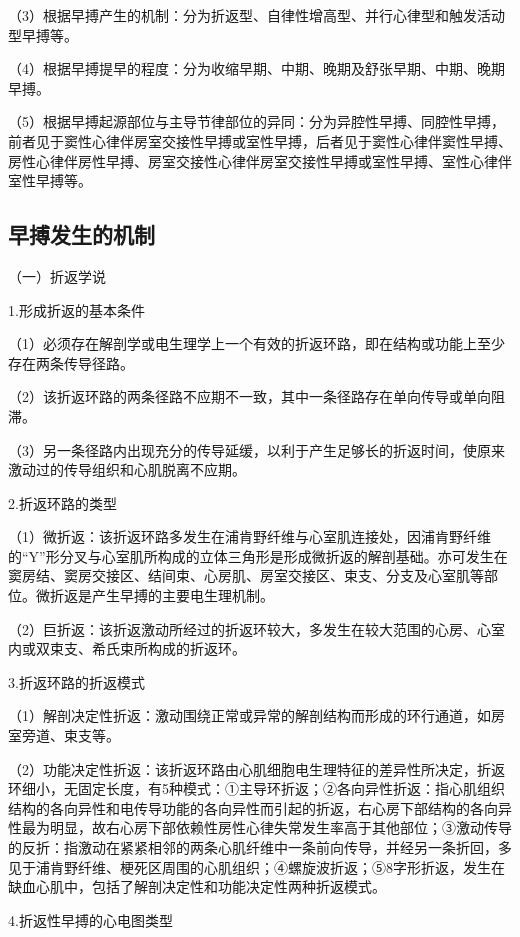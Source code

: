 （3）根据早搏产生的机制：分为折返型、自律性增高型、并行心律型和触发活动型早搏等。

（4）根据早搏提早的程度：分为收缩早期、中期、晚期及舒张早期、中期、晚期早搏。

（5）根据早搏起源部位与主导节律部位的异同：分为异腔性早搏、同腔性早搏，前者见于窦性心律伴房室交接性早搏或室性早搏，后者见于窦性心律伴窦性早搏、房性心律伴房性早搏、房室交接性心律伴房室交接性早搏或室性早搏、室性心律伴室性早搏等。

\protect\hypertarget{text00018.htmlux5cux23subid126}{}{}

\subsection{早搏发生的机制}

（一）折返学说

1.形成折返的基本条件

（1）必须存在解剖学或电生理学上一个有效的折返环路，即在结构或功能上至少存在两条传导径路。

（2）该折返环路的两条径路不应期不一致，其中一条径路存在单向传导或单向阻滞。

（3）另一条径路内出现充分的传导延缓，以利于产生足够长的折返时间，使原来激动过的传导组织和心肌脱离不应期。

2.折返环路的类型

（1）微折返：该折返环路多发生在浦肯野纤维与心室肌连接处，因浦肯野纤维的“Y”形分叉与心室肌所构成的立体三角形是形成微折返的解剖基础。亦可发生在窦房结、窦房交接区、结间束、心房肌、房室交接区、束支、分支及心室肌等部位。微折返是产生早搏的主要电生理机制。

（2）巨折返：该折返激动所经过的折返环较大，多发生在较大范围的心房、心室内或双束支、希氏束所构成的折返环。

3.折返环路的折返模式

（1）解剖决定性折返：激动围绕正常或异常的解剖结构而形成的环行通道，如房室旁道、束支等。

（2）功能决定性折返：该折返环路由心肌细胞电生理特征的差异性所决定，折返环细小，无固定长度，有5种模式：①主导环折返；②各向异性折返：指心肌组织结构的各向异性和电传导功能的各向异性而引起的折返，右心房下部结构的各向异性最为明显，故右心房下部依赖性房性心律失常发生率高于其他部位；③激动传导的反折：指激动在紧紧相邻的两条心肌纤维中一条前向传导，并经另一条折回，多见于浦肯野纤维、梗死区周围的心肌组织；④螺旋波折返；⑤8字形折返，发生在缺血心肌中，包括了解剖决定性和功能决定性两种折返模式。

4.折返性早搏的心电图类型

